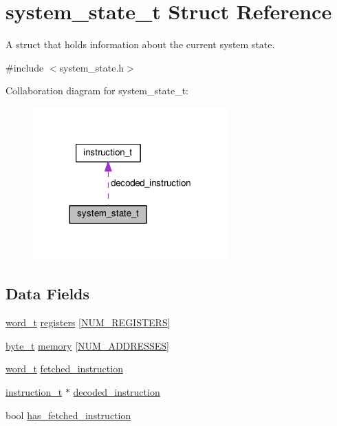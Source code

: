 \hypertarget{structsystem__state__t}{}\section{system\+\_\+state\+\_\+t Struct Reference}
\label{structsystem__state__t}


A struct that holds information about the current system state.  




{\ttfamily \#include $<$system\+\_\+state.\+h$>$}



Collaboration diagram for system\+\_\+state\+\_\+t\+:
\nopagebreak
\begin{figure}[H]
\begin{center}
\leavevmode
\includegraphics[width=213pt]{structsystem__state__t__coll__graph}
\end{center}
\end{figure}
\subsection*{Data Fields}
\begin{DoxyCompactItemize}
\item 
\hyperlink{global_8h_a0e7744482eed560726581dae7d3cb8b2}{word\+\_\+t} \hyperlink{structsystem__state__t_af042206b1a035449b5a10250fdc29e8f}{registers} \mbox{[}\hyperlink{global_8h_a5efff3a4a48efbf589e3a2320997d9b9}{N\+U\+M\+\_\+\+R\+E\+G\+I\+S\+T\+E\+RS}\mbox{]}
\item 
\hyperlink{global_8h_a0661d7d1353e0bca70c64563f635b034}{byte\+\_\+t} \hyperlink{structsystem__state__t_ade4e6995025b3b8eeeb62bdb38408765}{memory} \mbox{[}\hyperlink{global_8h_ad1d337f69c5203493cb37cb203c33e24}{N\+U\+M\+\_\+\+A\+D\+D\+R\+E\+S\+S\+ES}\mbox{]}
\item 
\hyperlink{global_8h_a0e7744482eed560726581dae7d3cb8b2}{word\+\_\+t} \hyperlink{structsystem__state__t_a9cb73fc3980fae6ad4eff34e8461d947}{fetched\+\_\+instruction}
\item 
\hyperlink{structinstruction__t}{instruction\+\_\+t} $\ast$ \hyperlink{structsystem__state__t_ab53a970384d9c812a2a4c6e327b19a95}{decoded\+\_\+instruction}
\item 
bool \hyperlink{structsystem__state__t_afe188f4e4c4fed3fab882599cfdafa76}{has\+\_\+fetched\+\_\+instruction}
\end{DoxyCompactItemize}


